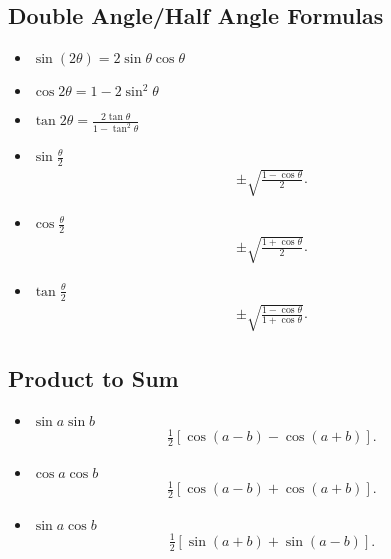 \documentclass{report}
\begin{document}
      \subsection{Double Angle/Half Angle Formulas}
      \begin{itemize}
        \item $\sin{(2\theta )} = 2\sin{\theta }\cos{\theta } $
        \item $\cos{2\theta } = 1- 2\sin^{2}{\theta } $
        \item $\tan{2\theta} = \frac{2\tan{\theta }}{1-\tan^{2}{\theta }}$
        \item $\sin{\frac{\theta}{2}} $
          \begin{align*}
            \pm \sqrt{\frac{1-\cos{\theta }}{2}}
          .\end{align*}
        \item $\cos{\frac{\theta}{2}}$
          \begin{align*}
            \pm \sqrt{\frac{1+\cos{\theta }}{2}}
          .\end{align*}
        \item $\tan{\frac{\theta }{2}} $
          \begin{align*}
            \pm \sqrt{\frac{1-\cos{\theta }}{1+\cos{\theta }}}
          .\end{align*}
      \end{itemize}

      \bigbreak \noindent \bigbreak \noindent 
      \subsection{Product to Sum}
      \begin{itemize}
        \item $\sin{a}\sin{b} $
          \begin{align*}
            \frac{1}{2}[\cos{(a-b)-\cos{(a+b)}}]
          .\end{align*}
        \item $\cos{a}\cos{b}$
          \begin{align*}
            \frac{1}{2}[\cos{(a-b)} + \cos{(a+b)}]
          .\end{align*}
        \item $\sin{a}\cos{b}$
          \begin{align*}
            \frac{1}{2}[\sin{(a+b)}+\sin{(a-b)}]
          .\end{align*}
      \end{itemize}
\end{document}
